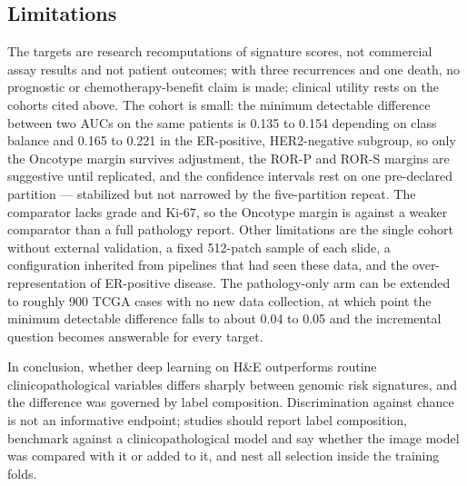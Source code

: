 \documentclass[11pt,a4paper]{article}
\begin{document}
\subsection{Limitations}
The targets are research recomputations of signature scores, not commercial assay results and not patient outcomes; with three recurrences and one death, no prognostic or chemotherapy-benefit claim is made; clinical utility rests on the cohorts cited above. The cohort is small: the minimum detectable difference between two AUCs on the same patients is 0.135 to 0.154 depending on class balance and 0.165 to 0.221 in the ER-positive, HER2-negative subgroup, so only the Oncotype margin survives adjustment, the ROR-P and ROR-S margins are suggestive until replicated, and the confidence intervals rest on one pre-declared partition --- stabilized but not narrowed by the five-partition repeat. The comparator lacks grade and Ki-67, so the Oncotype margin is against a weaker comparator than a full pathology report. Other limitations are the single cohort without external validation, a fixed 512-patch sample of each slide, a configuration inherited from pipelines that had seen these data, and the over-representation of ER-positive disease. The pathology-only arm can be extended to roughly 900 TCGA cases with no new data collection, at which point the minimum detectable difference falls to about 0.04 to 0.05 and the incremental question becomes answerable for every target.

In conclusion, whether deep learning on H\&E outperforms routine clinicopathological variables differs sharply between genomic risk signatures, and the difference was governed by label composition. Discrimination against chance is not an informative endpoint; studies should report label composition, benchmark against a clinicopathological model and say whether the image model was compared with it or added to it, and nest all selection inside the training folds.
\end{document}
